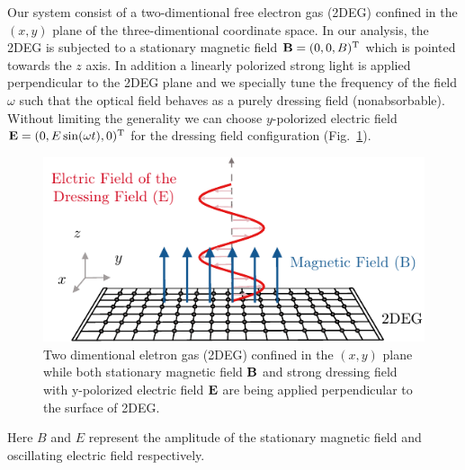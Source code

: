 
Our system consist of a two-dimentional free electron gas (2DEG) confined in the $(x,y)$ plane of the three-dimentional coordinate space. In our analysis, the 2DEG is subjected to a stationary magnetic field $\vb{B} = (0,0,B)^{\text{T}}$ which is pointed towards the $z$ axis. In addition a linearly polorized strong light is applied perpendicular to the 2DEG plane and we specially tune the frequency of the field $\omega$ such that the optical field behaves as a purely dressing field (nonabsorbable). Without limiting the generality we can choose $y$-polorized electric field $\vb{E} = (0,E\sin(\omega t),0)^{\text{T}}$ for the dressing field configuration (Fig.~\ref{fig_1}).
\begin{figure}[b]
\includegraphics{figures/fig_1}
\caption{\label{fig_1} Two dimentional eletron gas (2DEG) confined in the $(x,y)$ plane while both stationary magnetic field $\vb{B}$ and strong dressing field with y-polorized electric field $\vb{E}$ are being applied perpendicular to the surface of 2DEG.}
\end{figure}
Here $B$ and $E$ represent the amplitude of the stationary magnetic field and oscillating electric field respectively.

